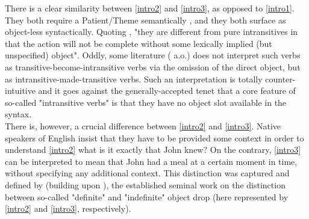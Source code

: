 There is a clear similarity between \ref{intro2} and \ref{intro3}, as opposed to \ref{intro1}. They both require a Patient/Theme semantically \parencite[510]{Somers1984}, and they both surface as object-less syntactically. Quoting \textcite[48]{Yasutake1987}, "they are different from pure intransitives in that the action will not be complete without some lexically implied (but unspecified) object". Oddly, some literature (\textcite{BourmayanRecanati2013, Liu2008} a.o.) does not interpret such verbs as transitive-become-intransitive verbs via the omission of the direct object, but as intransitive-made-transitive verbs. Such an interpretation is totally counter-intuitive and it goes against the generally-accepted tenet that a core feature of so-called "intransitive verbs" is that they have no object slot available in the syntax.\\
There is, however, a crucial difference between \ref{intro2} and \ref{intro3}. Native speakers of English insist that they have to be provided some context in order to understand \ref{intro2} \textemdash what is it exactly that John knew? On the contrary, \ref{intro3} can be interpreted to mean that John had a meal at a certain moment in time, without specifying any additional context. This distinction was captured and defined by \textcite{Fillmore1986} (building upon \textcite{fillmore1969types, Allerton1975}), the established seminal work on the distinction between so-called "definite" and "indefinite" object drop (here represented by \ref{intro2} and \ref{intro3}, respectively).

